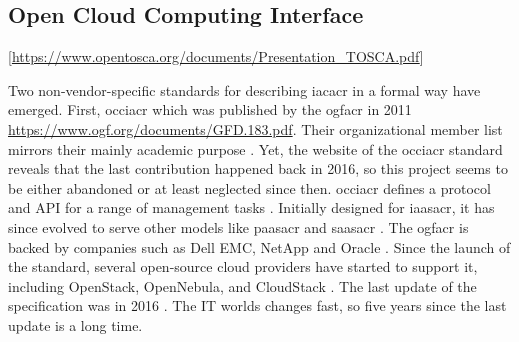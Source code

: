 \subsection{Open Cloud Computing Interface} %
[\url{https://www.opentosca.org/documents/Presentation\_TOSCA.pdf}]

Two non-vendor-specific standards for describing \gls{iacacr} in a formal way have emerged. First, \gls{occiacr} which was published by the \gls{ogfacr} in 2011 \url{https://www.ogf.org/documents/GFD.183.pdf}. Their organizational member list mirrors their mainly academic purpose \cite{ogf_members}. Yet, the website of the \gls{occiacr} standard reveals that the last contribution happened back in 2016, so this project seems to be either abandoned or at least neglected since then.
\newline
\Gls{occiacr} defines a protocol and API for a range of management tasks \cite{occi_about}. Initially designed for \gls{iaasacr}, it has since evolved to serve other models like \gls{paasacr} and \gls{saasacr} \cite{occi_about}. The \gls{ogfacr} is backed by companies such as Dell EMC, NetApp and Oracle \cite{hpcinthecloud_next_ogf} \cite{networkworld_ogf}. Since the launch of the standard, several open-source cloud providers have started to support it, including OpenStack, OpenNebula, and CloudStack \cite{occi_implementations}. The last update of the specification was in 2016 \cite{occi_index}. The IT worlds changes fast, so five years since the last update is a long time.

